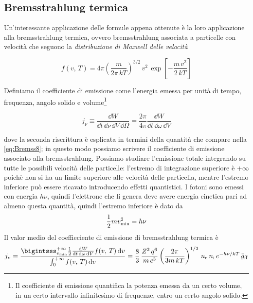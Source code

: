 \subsection{Bremsstrahlung termica}
Un'interessante applicazione delle formule appena ottenute è la loro applicazione alla bremsstrahlung termica, ovvero bremsstrahlung associata a particelle con velocità che seguono la \textit{distribuzione di Maxwell delle velocità}
\begin{EQ}
\begin{equation}
f(v, \,T) = 4\pi \left( \dfrac{m}{2\pi\,kT} \right)^{3/2}\, v^2\, \exp\left[-\dfrac{m\,v^2}{2\, kT}\right]
\end{equation}
\end{EQ}
Definiamo il coefficiente di emissione come l'energia emessa per unità di tempo, frequenza, angolo solido e volume\footnote{Il coefficiente di emissione quantifica la potenza emessa da un certo volume, in un certo intervallo infinitesimo di frequenze, entro un certo angolo solido.}
\begin{EQ}
\begin{equation}
j_\nu \equiv \dfrac{\dd W}{\dd t\, \dd \nu\, \dd V \, \dd\Omega} = \dfrac{2\pi}{4\pi} \dfrac{\dd W}{\dd t\, \dd \omega\, \dd V}
\end{equation}
\end{EQ}
dove la seconda riscrittura è esplicata in termini della quantità che compare nella \ref{eq:Bremss8}; in questo modo possiamo scrivere il coefficiente di emissione associato alla bremsstrahlung. Possiamo studiare l'emissione totale integrando su tutte le possibili velocità delle particelle: l'estremo di integrazione superiore è $+\infty$ poichè non si ha un limite superiore alle velocità delle particella, mentre l'estremo inferiore può essere ricavato introducendo effetti quantistici. I fotoni sono emessi con energia $h\nu$, quindi l'elettrone che li genera deve avere energia cinetica pari ad almeno questa quantità, quindi l'estremo inferiore è dato da
\begin{equation}
\dfrac{1}{2} mv_\mathrm{min}^2 = h\nu
\end{equation}
Il valor medio del coeffieciente di emissione di bremsstrahlung termica è
\begin{equation}
j_\nu = \dfrac{\bigintsss_{v_\mathrm{min}}^{+\infty} {\frac{1}{2} \frac{\dd W}{\dd t\, \dd \omega\, \dd V} f(v, \,T) \, \dd v}}{{\int_{0}^{+\infty}  {f(v, \,T)}\, \dd v}} = \dfrac{8}{3}\, \dfrac{Z^2\, q^6}{m\,c^3} \left( \dfrac{2\pi}{3m\,kT} \right)^{1/2} \,n_\mathrm{e}\,n_\mathrm{i} \, e^{-h\nu/kT} \, \bar{g}_\mathrm{ff}
\end{equation}
